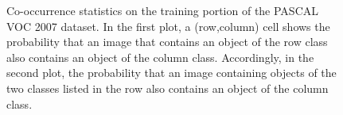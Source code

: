 \begin{figure}[h!]
\centering
{} \hfill
{}
  \caption{
  Co-occurrence statistics on the training portion of the PASCAL VOC 2007 dataset.
  In the first plot, a (row,column) cell shows the probability that an image that contains an object of the row class also contains an object of the column class.
  Accordingly, in the second plot, the probability that an image containing objects of the two classes listed in the row also contains an object of the column class.
  }
  \label{fig:dataset_stats}
\end{figure}

